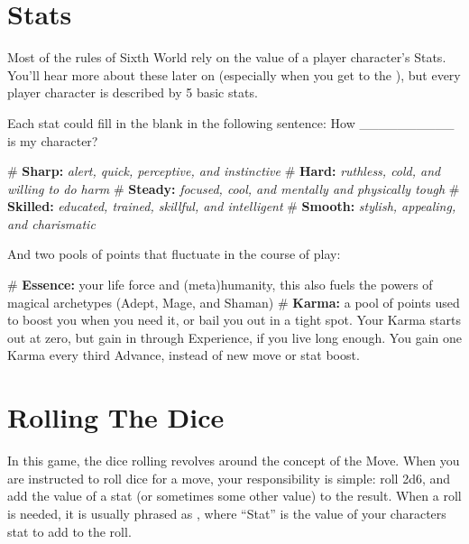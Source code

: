 \section{Stats}

Most of the rules of Sixth World rely on the value of a player character’s Stats. You’ll hear more about these later on (especially when you get to the ), but every player character is described by 5 basic stats.

Each stat could fill in the blank in the following sentence: How \_\_\_\_\_\_\_\_\_\_ is my character?

\begin{easylist}
# \textbf{Sharp:} \textit{alert, quick, perceptive, and instinctive}
# \textbf{Hard:} \textit{ruthless, cold, and willing to do harm}
# \textbf{Steady:} \textit{focused, cool, and mentally and physically tough}
# \textbf{Skilled:} \textit{educated, trained, skillful, and intelligent}
# \textbf{Smooth:} \textit{stylish, appealing, and charismatic}
\end{easylist}

And two pools of points that fluctuate in the course of play:

\begin{easylist}
# \textbf{Essence:} your life force and (meta)humanity, this also fuels the powers of magical archetypes (Adept, Mage, and Shaman)
# \textbf{Karma:} a pool of points used to boost you when you need it, or bail you out in a tight spot. Your Karma starts out at zero, but gain in through Experience, if you live long enough. You gain one Karma every third Advance, instead of new move or stat boost.
\end{easylist}




\section{Rolling The Dice}

In this game, the dice rolling revolves around the concept of the Move. When you are instructed to roll dice for a move, your responsibility is simple: roll 2d6, and add the value of a stat (or sometimes some other value) to the result. When a roll is needed, it is usually phrased as , where ``Stat'' is the value of your characters stat to add to the roll.


